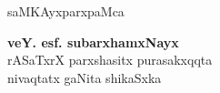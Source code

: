 \thispagestyle{empty}
\begin{center}
{\fontsize{30}{32}\selectfont saMKAyxparxpaMca}%
\vfill


{\LARGE\bfseries veY. esf. subarxhamxNayx}\\[4pt]
{\large rASaTxrX parxshasitx purasakxqqta\\[4pt]
nivaqtatx gaNita shikaSxka}
\vfill








\end{center}
